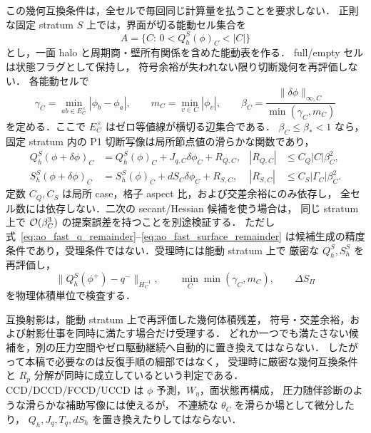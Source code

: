 この幾何互換条件は，全セルで毎回同じ計算量を払うことを要求しない．
正則な固定 stratum \(S\) 上では，界面が切る能動セル集合を
\[
  A=\{C:\,0<Q_h^S(\phi)_C<|C|\}
\]
とし，一面 halo と周期商・壁所有関係を含めた能動表を作る．
full/empty セルは状態フラグとして保持し，
符号余裕が失われない限り切断幾何を再評価しない．
各能動セルで
\[
  \gamma_C=\min_{ab\in E_C^\times}|\phi_b-\phi_a|,
  \qquad
  m_C=\min_{v\in C}|\phi_v|,
  \qquad
  \beta_C=
  \frac{\|\delta\phi\|_{\infty,C}}{\min(\gamma_C,m_C)}
  \label{eq:ao_fast_fixed_stratum_beta}
\]
を定める．ここで \(E_C^\times\) はゼロ等値線が横切る辺集合である．
\(\beta_C\le\beta_*<1\) なら，固定 stratum 内の P1 切断写像は局所節点値の滑らかな関数であり，
\begin{align}
  Q_h^S(\phi+\delta\phi)_C
  &=
  Q_h^S(\phi)_C + J_{q,C}\delta\phi_C + R_{Q,C},
  &
  |R_{Q,C}|
  &\le C_Q |C|\beta_C^2,
  \label{eq:ao_fast_q_remainder}
  \\
  S_h^S(\phi+\delta\phi)_C
  &=
  S_h^S(\phi)_C + dS_C\delta\phi_C + R_{S,C},
  &
  |R_{S,C}|
  &\le C_S |\Gamma_C|\beta_C^2 .
  \label{eq:ao_fast_surface_remainder}
\end{align}
定数 \(C_Q,C_S\) は局所 case，格子 aspect 比，および交差余裕にのみ依存し，
全セル数には依存しない．二次の secant/Hessian 候補を使う場合は，
同じ stratum 上で \(\mathcal{O}(\beta_C^3)\) の提案誤差を持つことを別途検証する．
ただし式~\eqref{eq:ao_fast_q_remainder}--\eqref{eq:ao_fast_surface_remainder}
は候補生成の精度条件であり，受理条件ではない．受理時には能動 stratum 上で
厳密な \(Q_h^S,S_h^S\) を再評価し，
\[
  \|Q_h^S(\phi^+)-q^-\|_{H_C^{-1}},
  \qquad
  \min_C \min(\gamma_C,m_C),
  \qquad
  \Delta S_\Pi
\]
を物理体積単位で検査する．

互換射影は，能動 stratum 上で再評価した幾何体積残差，
符号・交差余裕，および射影仕事を同時に満たす場合だけ受理する．
どれか一つでも満たさない候補を，別の圧力空間やゼロ駆動継続へ自動的に置き換えてはならない．
したがって本稿で必要なのは反復手順の細部ではなく，
受理時に厳密な幾何互換条件と $R_p$ 分解が同時に成立しているという判定である．
CCD/DCCD/FCCD/UCCD は \(\phi\) 予測，\(W_\eta\)，面状態再構成，
圧力随伴診断のような滑らかな補助写像には使えるが，
不連続な \(\theta_C\) を滑らか場として微分したり，
\(Q_h,J_q,T_q,dS_h\) を置き換えたりしてはならない．

